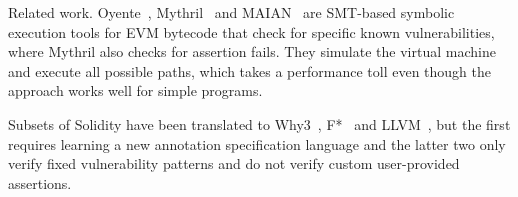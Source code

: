 \begin{paragraph}{Related work.}
Oyente~\cite{Luu2016}, Mythril~\cite{Mythril} and MAIAN~\cite{NKSSH18} are SMT-based symbolic
execution tools for EVM bytecode that check for specific known vulnerabilities,
where Mythril also checks for assertion fails. They simulate the virtual
machine and execute all possible paths, which takes a performance toll even
though the approach works well for simple programs.

Subsets of Solidity have been translated to Why3~\cite{Why3},
F*~\cite{Bhargavan2016} and LLVM~\cite{ZEUS}, but the first requires learning a new annotation
specification language and the latter two only verify fixed vulnerability
patterns and do not verify custom user-provided assertions.

\end{paragraph}
